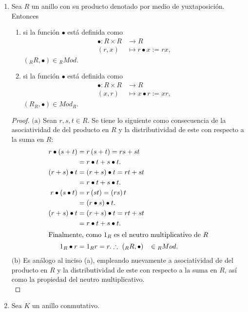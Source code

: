 \documentclass{article}
\newcommand{\lrprth}[1]{
    \left(#1\right)
}
\newcommand{\descapp}[6]{
    #1: #2 &\rightarrow #3\\
    #4 &\mapsto #5#6 
}
\theoremstyle{definition}
\theoremstyle{plain}
\theoremstyle{plain}
\theoremstyle{definition}
\theoremstyle{definition}
\theoremstyle{definition}
\theoremstyle{definition}
\theoremstyle{definition}
\theoremstyle{definition}
\begin{document}
\begin{enumerate}[label=\textbf{Ej \arabic*.}]
    \item Sea $R$ un anillo con su producto denotado por medio de yuxtaposición. Entonces
    \begin{enumerate}[label=(\alph*)]
        \item si la función $\bullet$ está definida como
        \begin{align*}
            \descapp{\bullet}{R\times R}{R}{(r,x)}{r\bullet x:=rx}{,}
        \end{align*}
        $\lrprth{{}_RR,\bullet}\in {}_RMod$.
        \item si la función $\bullet$ está definida como
        \begin{align*}
            \descapp{\bullet}{R\times R}{R}{(x,r)}{x\bullet r:=xr}{,}
        \end{align*}
        $(R_R,\bullet)\in Mod_R$.
    \end{enumerate}
    \begin{proof}
    $\boxed{\text{(a)}}$ 
    Sean $r,s,t\in R$. Se tiene lo siguiente como consecuencia de la asociatividad de del producto en $R$ y la distributividad de este con respecto a la suma en $R$:
    \begin{align*}
        r\bullet\lrprth{s+t}&=r\lrprth{s+t}=rs+st\\
        &=r\bullet t + s\bullet t.\\
        \lrprth{r+s}\bullet t&=\lrprth{r+s}\bullet t=rt+st\\
        &=r\bullet t + s\bullet t.\\
        r\bullet\lrprth{s\bullet t}&=r\lrprth{st}=\lrprth{rs}t\\
        &=\lrprth{r\bullet s}\bullet t.\\
        \lrprth{r+s}\bullet t&=\lrprth{r+s}\bullet t=rt+st\\
        &=r\bullet t + s\bullet t.\\
        \intertext{Finalmente, como $1_R$ es el neutro multiplicativo de $R$}
        1_R\bullet r&= 1_Rr=r.
        \therefore \ \lrprth{{}_RR,\bullet}&\in {}_RMod.
    \end{align*}
    $\boxed{\text{(b)}}$ Es análogo al inciso (a), empleando nuevamente a asociatividad de del producto en $R$ y la distributividad de este con respecto a la suma en $R$, así como la propiedad del neutro multiplicativo. \\
    \end{proof}
    \item
    Sea $K$ un anillo conmutativo.
\begin{enumerate}

\end{enumerate}
\end{enumerate}
\end{document}
